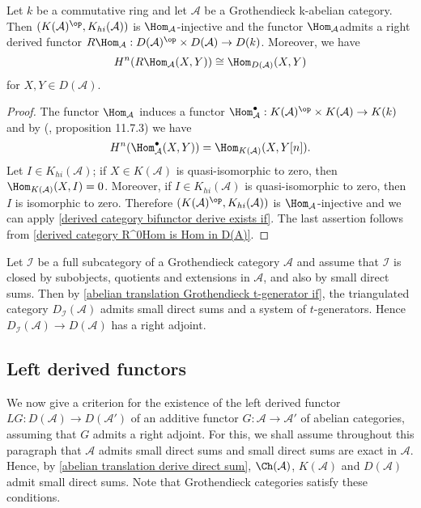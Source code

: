 \begin{corollary}\label{abelian Grothendieck unbounded derived category RHom}
Let $k$ be a commutative ring and let $\mathcal{A}$ be a Grothendieck
k-abelian category. Then $(K(\mathcal{A})^{\op},K_{hi}(\mathcal{A}))$ is $\Hom_{\mathcal{A}}$-injective and the functor $\Hom_\mathcal{A} $admits a right derived functor $R\Hom_\mathcal{A}:D(\mathcal{A})^{\op}\times D(\mathcal{A})\to D(k)$. Moreover, we have
\[H^n(R\Hom_\mathcal{A}(X,Y))\cong \Hom_{D(\mathcal{A})}(X,Y)\]
for $X,Y\in D(\mathcal{A})$.
\end{corollary}
\begin{proof}
The functor $\Hom_\mathcal{A}$ induces a functor $\Hom_\mathcal{A}^\bullet:K(\mathcal{A})^{\op}\times K(\mathcal{A})\to K(k)$ and by (\cite{kashiwara_SAC}, proposition 11.7.3) we have
\[H^n(\Hom_\mathcal{A}^\bullet(X,Y))=\Hom_{K(\mathcal{A})}(X,Y[n]).\]
Let $I\in K_{hi}(\mathcal{A})$; if $X\in K(\mathcal{A})$ is quasi-isomorphic to zero, then $\Hom_{K(\mathcal{A})}(X,I)=0$. Moreover, if $I\in K_{hi}(\mathcal{A})$ is quasi-isomorphic to zero, then $I$ is isomorphic to zero. Therefore $(K(\mathcal{A})^{\op},K_{hi}(\mathcal{A}))$ is $\Hom_{\mathcal{A}}$-injective and we can apply \cref{derived category bifunctor derive exists if}. The last assertion follows from \cref{derived category R^0Hom is Hom in D(A)}.
\end{proof}

\begin{remark}
Let $\mathcal{I}$ be a full subcategory of a Grothendieck category $\mathcal{A}$ and assume that $\mathcal{I}$ is closed by subobjects, quotients and extensions in $\mathcal{A}$, and also by small direct sums. Then by \cref{abelian translation Grothendieck t-generator if}, the triangulated category $D_\mathcal{I}(\mathcal{A})$ admits small direct sums and a system of $t$-generators. Hence $D_\mathcal{I}(\mathcal{A})\to D(\mathcal{A})$ has a right adjoint.
\end{remark}

\subsection{Left derived functors}
We now give a criterion for the existence of the left derived functor $LG:D(\mathcal{A})\to D(\mathcal{A}')$ of an additive functor $G:\mathcal{A}\to\mathcal{A}'$ of abelian categories, assuming that $G$ admits a right adjoint. For this, we shall assume throughout this paragraph that $\mathcal{A}$ admits small direct sums and small direct sums are exact in $\mathcal{A}$. Hence, by \cref{abelian translation derive direct sum}, $\Ch(\mathcal{A})$, $K(\mathcal{A})$ and $D(\mathcal{A})$ admit small direct sums. Note that Grothendieck categories satisfy these conditions.


